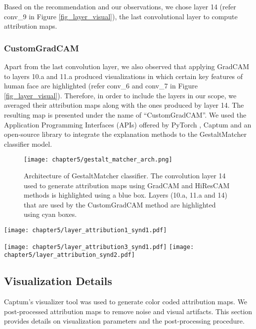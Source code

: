 \documentclass[../report.tex]{subfiles}
\begin{document}
	Based on the recommendation and our observations, we chose layer 14 (refer conv\_9 in Figure \ref{fig_layer_visual}), the last convolutional layer to compute attribution maps.\\
	\subsubsection{CustomGradCAM}
	Apart from the last convolution layer, we also observed that applying GradCAM to layers 10.a and 11.a produced visualizations in which certain key features of human face are highlighted (refer conv\_6 and conv\_7 in Figure \ref{fig_layer_visual}). Therefore, in order to include the layers in our scope, we averaged their attribution maps along with the ones produced by layer 14. The resulting map is presented under the name of \enquote{CustomGradCAM}. We used the Application Programming Interfaces (APIs) offered by PyTorch \cite{paszke2019pytorch}, Captum \cite{kokhlikyan2020captum} and an open-source library \cite{jacobgilpytorchcam} to integrate the explanation methods to the GestaltMatcher classifier model.
	\begin{figure}[ht]
		\hspace*{1.0cm}      
		\texttt{[image: chapter5/gestalt\_matcher\_arch.png]}
		\caption{Architecture of GestaltMatcher classifier. The convolution layer 14 used to generate attribution maps using GradCAM and HiResCAM methods is highlighted using a blue box. Layers (10.a, 11.a and 14) that are used by the CustomGradCAM method are highlighted using cyan boxes. }
		\label{fig_arch_gest_matcher}
	\end{figure}
	\begin{sidewaysfigure}
	\texttt{[image: chapter5/layer\_attribution1\_synd1.pdf]}
	
	\texttt{[image: chapter5/layer\_attribution3\_synd1.pdf]}
	\label{fig_gm_pipeline}	      
	\texttt{[image: chapter5/layer\_attribution\_synd2.pdf]}
	\caption{Layer-wise visualization of attribution maps generated by GradCAM and HiResCAM methods.}
	\label{fig_layer_visual}
\end{sidewaysfigure}
	\subsection{Visualization Details}
	 Captum's visualizer tool was used to generate color coded attribution maps. We post-processed attribution maps to remove noise and visual artifacts. This section provides details on visualization parameters and the post-processing procedure.
\end{document}
